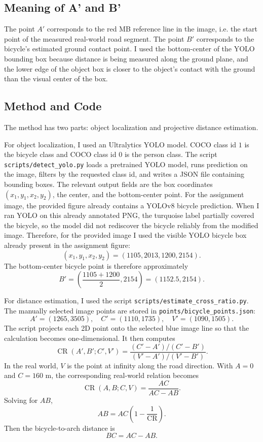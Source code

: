 \documentclass[11pt]{article}
\begin{document}
\subsection{Meaning of A' and B'}

The point \(A'\) corresponds to the red MB reference line in the image, i.e. the start point of the measured real-world road segment. The point \(B'\) corresponds to the bicycle's estimated ground contact point. I used the bottom-center of the YOLO bounding box because distance is being measured along the ground plane, and the lower edge of the object box is closer to the object's contact with the ground than the visual center of the box.

\subsection{Method and Code}

The method has two parts: object localization and projective distance estimation.

For object localization, I used an Ultralytics YOLO model. COCO class id \(1\) is the bicycle class and COCO class id \(0\) is the person class. The script \texttt{scripts/detect\_yolo.py} loads a pretrained YOLO model, runs prediction on the image, filters by the requested class id, and writes a JSON file containing bounding boxes. The relevant output fields are the box coordinates \((x_1,y_1,x_2,y_2)\), the center, and the bottom-center point. For the assignment image, the provided figure already contains a YOLOv8 bicycle prediction. When I ran YOLO on this already annotated PNG, the turquoise label partially covered the bicycle, so the model did not rediscover the bicycle reliably from the modified image. Therefore, for the provided image I used the visible YOLO bicycle box already present in the assignment figure:
\[
(x_1,y_1,x_2,y_2) = (1105, 2013, 1200, 2154).
\]
The bottom-center bicycle point is therefore approximately
\[
B' = \left(\frac{1105+1200}{2}, 2154\right) = (1152.5, 2154).
\]

For distance estimation, I used the script \texttt{scripts/estimate\_cross\_ratio.py}. The manually selected image points are stored in \texttt{points/bicycle\_points.json}:
\[
A'=(1265,3505),\quad C'=(1110,1735),\quad V'=(1090,1505).
\]
The script projects each 2D point onto the selected blue image line so that the calculation becomes one-dimensional. It then computes
\[
\operatorname{CR}(A',B';C',V')
=
\frac{(C'-A')/(C'-B')}{(V'-A')/(V'-B')}.
\]
In the real world, \(V\) is the point at infinity along the road direction. With \(A=0\) and \(C=160\) m, the corresponding real-world relation becomes
\[
\operatorname{CR}(A,B;C,V)=\frac{AC}{AC-AB}.
\]
Solving for \(AB\),
\[
AB = AC\left(1-\frac{1}{\operatorname{CR}}\right).
\]
Then the bicycle-to-arch distance is
\[
BC = AC - AB.
\]
\end{document}
